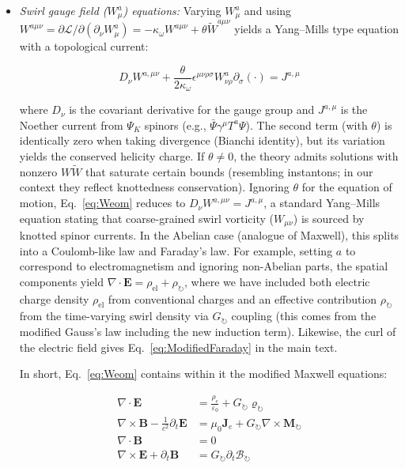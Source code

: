 \documentclass[10pt,reprint,aps,onecolumn,nofootinbib]{revtex4-2}
\begin{document}
\begin{itemize}
\item 
\emph{Swirl gauge field ($W^a_\mu$) equations:} Varying $W^a_\mu$ and using $W^{a\mu\nu} = \partial \mathcal{L}/\partial (\partial_\nu W^a_\mu) = -\kappa_\omega W^{a\mu\nu} + \theta \tilde{W}^{a\mu\nu}$ yields a Yang--Mills type equation with a topological current:

\begin{equation}
D_\nu W^{a,\mu\nu} + \frac{\theta}{2\kappa_\omega} \epsilon^{\mu\nu\rho\sigma} W^a_{\nu\rho} \partial_\sigma (\cdot) = J^{a,\mu}
\label{eq:Weom}
\end{equation}

where $D_\nu$ is the covariant derivative for the gauge group and $J^{a,\mu}$ is the Noether current from $\Psi_K$ spinors (e.g., $\bar{\Psi}\gamma^\mu T^a \Psi$). The second term (with $\theta$) is identically zero when taking divergence (Bianchi identity), but its variation yields the conserved helicity charge. If $\theta \neq 0$, the theory admits solutions with nonzero $W\tilde{W}$ that saturate certain bounds (resembling instantons; in our context they reflect knottedness conservation). Ignoring $\theta$ for the equation of motion, Eq.~\eqref{eq:Weom} reduces to $D_\nu W^{a,\mu\nu} = J^{a,\mu}$, a standard Yang--Mills equation stating that coarse-grained swirl vorticity ($W_{\mu\nu}$) is sourced by knotted spinor currents. In the Abelian case (analogue of Maxwell), this splits into a Coulomb-like law and Faraday's law. For example, setting $a$ to correspond to electromagnetism and ignoring non-Abelian parts, the spatial components yield $\nabla \cdot \mathbf{E} = \rho_{\text{el}} + \rho_{\circlearrowright}$, where we have included both electric charge density $\rho_{\text{el}}$ from conventional charges and an effective contribution $\rho_{\circlearrowright}$ from the time-varying swirl density via $G_{\circlearrowright}$ coupling (this comes from the modified Gauss's law including the new induction term). Likewise, the curl of the electric field gives Eq.~\ref{eq:ModifiedFaraday} in the main text.

In short, Eq.~\eqref{eq:Weom} contains within it the modified Maxwell equations:

\begin{align*}
\nabla \cdot \mathbf{E} &= \frac{\rho_e}{\varepsilon_0} + G_{\circlearrowright} \varrho_{\circlearrowright} \\
\nabla \times \mathbf{B} - \frac{1}{c^2} \partial_t \mathbf{E} &= \mu_0 \mathbf{J}_e + G_{\circlearrowright} \nabla \times \mathbf{M}_{\circlearrowright} \\
\nabla \cdot \mathbf{B} &= 0 \\
\nabla \times \mathbf{E} + \partial_t \mathbf{B} &= G_{\circlearrowright} \partial_t \bm{\mathcal{B}}_{\circlearrowright}
\end{align*}


\end{itemize}
\end{document}
